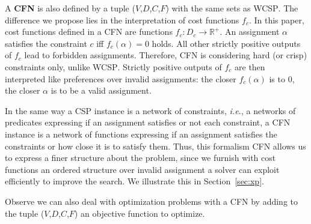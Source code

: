 \documentclass{article}
\newcommand{\ie}{\textit{i.e.}}
\newcommand{\csp}{\textsc{CSP}\xspace}
\newcommand{\cfn}{\textsc{CFN}\xspace}
\newcommand{\wcsp}{\textsc{WCSP}\xspace}
\begin{document}
A \textbf{\cfn} is also defined  by a tuple ($V$,$D$,$C$,$F$) with the
same  sets  as   \wcsp.   The  difference  we  propose   lies  in  the
interpretation of cost functions $f_c$.  In this paper, cost functions
defined   in   a   \cfn    are   functions   $f_c:   D_c   \rightarrow
\mathbb{R}^+$. An assignment $\alpha$ satisfies the constraint $c$ iff
$f_c(\alpha) = 0$ holds. All  other strictly positive outputs of $f_c$
lead to forbidden assignments. Therefore, \cfn is considering hard (or
crisp) constraints  only, unlike  \wcsp. Strictly positive  outputs of
$f_c$ are then interpreted  like preferences over invalid assignments:
the closer $f_c(\alpha)$ is to 0, the closer $\alpha$ is to be a valid
assignment.

In the same  way a \csp instance  is a network of  constraints, \ie, a
networks of  predicates expressing if  an assignment satisfies  or not
each constraint, a \cfn instance  is a network of functions expressing
if  an assignment  satisfies the  constraints or  how close  it is  to
satisfy them. Thus,  this formalism \cfn allows us to  express a finer
structure about the  problem, since we furnish with  cost functions an
ordered  structure  over  invalid  assignment  a  solver  can  exploit
efficiently   to   improve  the   search.   We   illustrate  this   in
Section~\ref{sec:xp}.

Observe we  can also deal  with optimization  problems with a  \cfn by
adding  to  the  tuple  ($V$,$D$,$C$,$F$)  an  objective  function  to
optimize.



\end{document}
